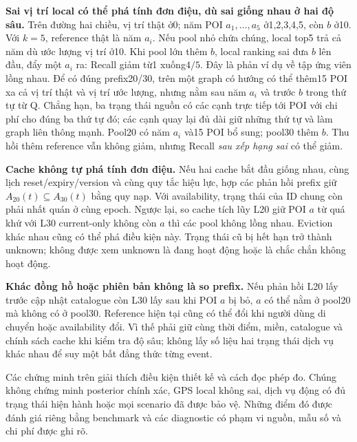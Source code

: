 \textbf{Sai vị trí local có thể phá tính đơn điệu, dù sai giống nhau ở
hai độ sâu.} Trên đường hai chiều, vị trí thật ở0; năm POI $a_1,\ldots,a_5$
ở1,2,3,4,5, còn $b$ ở10. Với $k=5$, reference thật là năm $a_i$.
Nếu pool nhỏ chứa chúng, local top5 trả cả năm dù ước lượng vị trí ở10.
Khi pool lớn thêm $b$, local ranking sai đưa $b$ lên đầu, đẩy một $a_i$
ra: Recall giảm từ1 xuống$4/5$. Đây là phản ví dụ về tập ứng viên lồng
nhau. Để có đúng prefix20/30, trên một graph có hướng có thể thêm15 POI
xa cả vị trí thật và vị trí ước lượng, nhưng nằm sau năm $a_i$ và trước
$b$ trong thứ tự từ Q. Chẳng hạn, ba trạng thái nguồn có các cạnh trực
tiếp tới POI với chi phí cho đúng ba thứ tự đó; các cạnh quay lại đủ dài
giữ những thứ tự và làm graph liên thông mạnh. Pool20 có năm $a_i$ và15
POI bổ sung; pool30 thêm $b$. Thu hồi thêm reference vẫn không giảm,
nhưng Recall \emph{sau xếp hạng sai} có thể giảm.

\textbf{Cache không tự phá tính đơn điệu.} Nếu hai cache bắt đầu giống
nhau, cùng lịch reset/expiry/version và cùng quy tắc hiệu lực, hợp các
phản hồi prefix giữ $A_{20}(t)\subseteq A_{30}(t)$ bằng quy nạp. Với
availability, trạng thái của ID chung còn phải nhất quán ở cùng epoch.
Ngược lại, so cache tích lũy L20 giữ POI $a$ từ quá khứ với L30 current-only
không còn $a$ thì các pool không lồng nhau. Eviction khác nhau cũng có
thể phá điều kiện này. Trạng thái cũ bị hết hạn trở thành unknown; không
được xem unknown là đang hoạt động hoặc là chắc chắn không hoạt động.

\textbf{Khác đồng hồ hoặc phiên bản không là so prefix.} Nếu phản hồi
L20 lấy trước cập nhật catalogue còn L30 lấy sau khi POI $a$ bị bỏ,
$a$ có thể nằm ở pool20 mà không có ở pool30. Reference hiện tại cũng
có thể đổi khi người dùng di chuyển hoặc availability đổi. Vì thế phải
giữ cùng thời điểm, miền, catalogue và chính sách cache khi kiểm tra
độ sâu; không lấy số liệu hai trạng thái dịch vụ khác nhau để suy một
bất đẳng thức từng event.

Các chứng minh trên giải thích điều kiện thiết kế và cách đọc phép đo.
Chúng không chứng minh posterior chính xác, GPS local không sai, dịch vụ
động có đủ trạng thái hiện hành hoặc mọi scenario đã được bảo vệ. Những
điểm đó được đánh giá riêng bằng benchmark và các diagnostic có phạm vi
nguồn, mẫu số và chi phí được ghi rõ.
